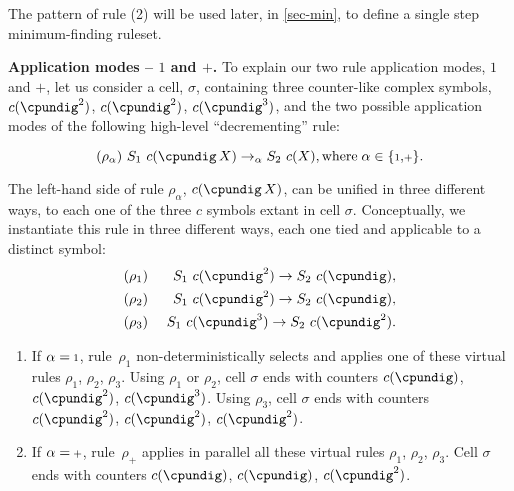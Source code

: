 The pattern of rule (2) will be used later, in \autoref{sec-min}, 
to define a single step minimum-finding ruleset.

\smallskip
\noindent
\textbf{Application modes -- $1$ and $+$.}
To explain our two rule application modes, $1$ and $+$,
let us consider a cell, $\sigma$, containing three counter-like complex symbols,
$c(\cpundig^2)$, $c(\cpundig^2)$, $c(\cpundig^3)$,
and the two possible application modes of the following high-level ``decrementing'' rule:
\vspace{-0.2cm}
\begin{framed}
\vspace{-0.5cm}
$$(\rho_\alpha) ~S_1 ~c(\cpundig \, X) \rightarrow_{\alpha} S_2 ~c(X),\\
\mathrm{where} \; \alpha \in \{\scriptstyle 1 \displaystyle, \scriptstyle + \displaystyle\}.$$
\vspace{-0.8cm}
\end{framed}

The left-hand side of rule $\rho_\alpha$, $c(\cpundig \, X)$, can be unified in three different ways,
to each one of the three $c$ symbols extant in cell $\sigma$.
Conceptually, we instantiate this rule in three different ways,
each one tied and applicable to a distinct symbol:
\begin{eqnarray*}
& (\rho_1)  & ~S_1 ~c(\cpundig^2) \rightarrow S_2 ~c(\cpundig),\\
& (\rho_2)  & ~S_1 ~c(\cpundig^2) \rightarrow S_2 ~c(\cpundig),\\
& (\rho_3) & ~S_1 ~c(\cpundig^3) \rightarrow S_2 ~c(\cpundig^2).
\end{eqnarray*}

\begin{enumerate}
\item If $\alpha = \: \scriptstyle 1 \displaystyle$, rule~$\rho_1$ 
non-deterministically selects and applies one of these virtual rules $\rho_1$, $\rho_2$, $\rho_3$.
Using $\rho_1$ or $\rho_2$, 
cell $\sigma$ ends with counters $c(\cpundig)$, $c(\cpundig^2)$, $c(\cpundig^3)$.
Using $\rho_3$,
cell $\sigma$ ends with counters $c(\cpundig^2)$, $c(\cpundig^2)$, $c(\cpundig^2)$.

\smallskip
\item If $\alpha = \: \scriptstyle + \displaystyle$, rule~$\rho_+$ 
applies in parallel all these virtual rules $\rho_1$, $\rho_2$, $\rho_3$.
Cell $\sigma$ ends with counters $c(\cpundig)$, $c(\cpundig)$, $c(\cpundig^2)$.
\end{enumerate}

